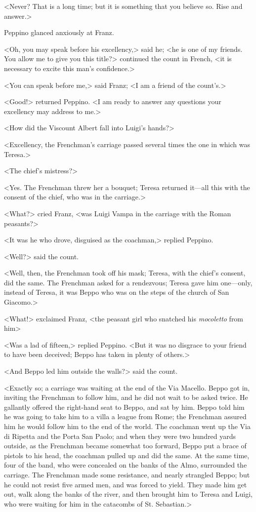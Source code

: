  <Never? That is a long time; but it is something that you believe so. Rise and answer.> 

 Peppino glanced anxiously at Franz. 

 <Oh, you may speak before his excellency,> said he; <he is one of my friends. You allow me to give you this title?> continued the count in French, <it is necessary to excite this man's confidence.> 

 <You can speak before me,> said Franz; <I am a friend of the count's.> 

 <Good!> returned Peppino. <I am ready to answer any questions your excellency may address to me.> 

 <How did the Viscount Albert fall into Luigi's hands?> 

 <Excellency, the Frenchman's carriage passed several times the one in which was Teresa.> 

 <The chief's mistress?> 

 <Yes. The Frenchman threw her a bouquet; Teresa returned it—all this with the consent of the chief, who was in the carriage.> 

 <What?> cried Franz, <was Luigi Vampa in the carriage with the Roman peasants?> 

 <It was he who drove, disguised as the coachman,> replied Peppino. 

 <Well?> said the count. 

 <Well, then, the Frenchman took off his mask; Teresa, with the chief's consent, did the same. The Frenchman asked for a rendezvous; Teresa gave him one—only, instead of Teresa, it was Beppo who was on the steps of the church of San Giacomo.> 

 <What!> exclaimed Franz, <the peasant girl who snatched his \textit{mocoletto} from him\longdash> 

 <Was a lad of fifteen,> replied Peppino. <But it was no disgrace to your friend to have been deceived; Beppo has taken in plenty of others.> 

 <And Beppo led him outside the walls?> said the count. 

 <Exactly so; a carriage was waiting at the end of the Via Macello. Beppo got in, inviting the Frenchman to follow him, and he did not wait to be asked twice. He gallantly offered the right-hand seat to Beppo, and sat by him. Beppo told him he was going to take him to a villa a league from Rome; the Frenchman assured him he would follow him to the end of the world. The coachman went up the Via di Ripetta and the Porta San Paolo; and when they were two hundred yards outside, as the Frenchman became somewhat too forward, Beppo put a brace of pistols to his head, the coachman pulled up and did the same. At the same time, four of the band, who were concealed on the banks of the Almo, surrounded the carriage. The Frenchman made some resistance, and nearly strangled Beppo; but he could not resist five armed men, and was forced to yield. They made him get out, walk along the banks of the river, and then brought him to Teresa and Luigi, who were waiting for him in the catacombs of St. Sebastian.> 

